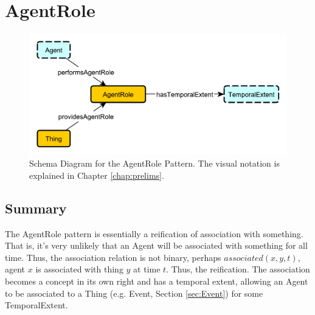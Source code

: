 \section{AgentRole}
\label{sec:AgentRole}
\begin{figure}[h!]
\begin{center}
\includegraphics[width=.8\textwidth]{figures/agentrole}
\end{center}
\caption{Schema Diagram for the AgentRole Pattern. The visual notation is explained in Chapter \ref{chap:prelims}.}
\label{fig:AgentRole}
\end{figure}
\subsection{Summary}
\label{sum:AgentRole}
The \textsf{AgentRole} pattern is essentially a reification of association with something. That is, it's very unlikely that an Agent will be associated with something for all time. Thus, the association relation is not binary, perhaps $\textit{associated}(x,y,t)$, agent $x$ is associated with thing $y$ at time $t$. Thus, the reification. The association becomes a concept in its own right and has a temporal extent, allowing an \textsf{Agent} to be associated to a \textsf{Thing} (e.g. \textsf{Event}, Section \ref{sec:Event}) for some \textsf{TemporalExtent}. 

